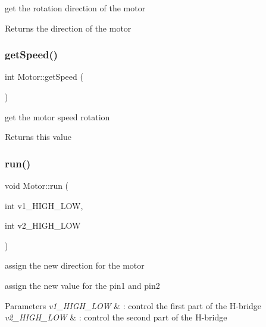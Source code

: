 get the rotation direction of the motor 

\begin{DoxyReturn}{Returns}
the direction of the motor 
\end{DoxyReturn}
\mbox{\label{class_motor_a4d03ea62bd9f5579d4fbe16d10462962}} 
\subsubsection{\texorpdfstring{get\+Speed()}{getSpeed()}}
{\footnotesize\ttfamily int Motor\+::get\+Speed (\begin{DoxyParamCaption}{ }\end{DoxyParamCaption})}



get the motor speed rotation 

\begin{DoxyReturn}{Returns}
this value 
\end{DoxyReturn}
\mbox{\label{class_motor_a7ee681f77332ff9fd64365f90a12da50}} 
\subsubsection{\texorpdfstring{run()}{run()}}
{\footnotesize\ttfamily void Motor\+::run (\begin{DoxyParamCaption}\item[{int}]{v1\+\_\+\+H\+I\+G\+H\+\_\+\+L\+OW,  }\item[{int}]{v2\+\_\+\+H\+I\+G\+H\+\_\+\+L\+OW }\end{DoxyParamCaption})}



assign the new direction for the motor 

assign the new value for the pin1 and pin2


\begin{DoxyParams}{Parameters}
{\em v1\+\_\+\+H\+I\+G\+H\+\_\+\+L\+OW} & \+: control the first part of the H-\/bridge \\
\hline
{\em v2\+\_\+\+H\+I\+G\+H\+\_\+\+L\+OW} & \+: control the second part of the H-\/bridge \\
\hline
\end{DoxyParams}
\mbox{\label{class_motor_a6ac966a2639aaba6a19e1596a37bc475}} 
